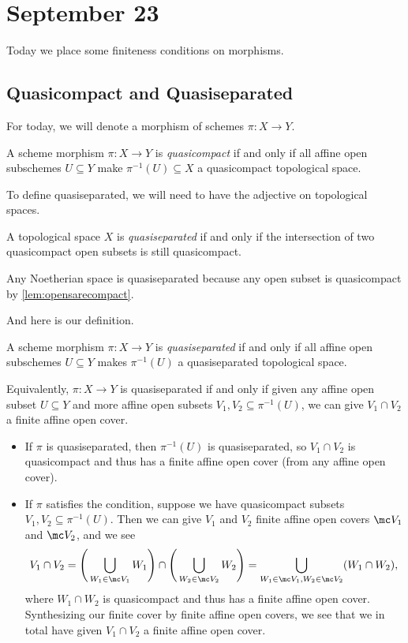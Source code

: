\documentclass[../notes.tex]{subfiles}
\begin{document}
\section{September 23}

Today we place some finiteness conditions on morphisms.

\subsection{Quasicompact and Quasiseparated}
For today, we will denote a morphism of schemes $\pi\colon X\to Y$.
\begin{definition}[Quasicompact]
	A scheme morphism $\pi\colon X\to Y$ is \textit{quasicompact} if and only if all affine open subschemes $U\subseteq Y$ make $\pi^{-1}(U)\subseteq X$ a quasicompact topological space.
\end{definition}
To define quasiseparated, we will need to have the adjective on topological spaces.
\begin{definition}[Quasiseperated]
	A topological space $X$ is \textit{quasiseparated} if and only if the intersection of two quasicompact open subsets is still quasicompact.
\end{definition}
\begin{example}
	Any Noetherian space is quasiseparated because any open subset is quasicompact by \autoref{lem:opensarecompact}.
\end{example}
And here is our definition.
\begin{defi}[Quasiseparated]
	A scheme morphism $\pi\colon X\to Y$ is \textit{quasiseparated} if and only if all affine open subschemes $U\subseteq Y$ makes $\pi^{-1}(U)$ a quasiseparated topological space.
\end{defi}
\begin{remark}
	Equivalently, $\pi\colon X\to Y$ is quasiseparated if and only if given any affine open subset $U\subseteq Y$ and more affine open subsets $V_1,V_2\subseteq\pi^{-1}(U)$, we can give $V_1\cap V_2$ a finite affine open cover.
	\begin{itemize}
		\item If $\pi$ is quasiseparated, then $\pi^{-1}(U)$ is quasiseparated, so $V_1\cap V_2$ is quasicompact and thus has a finite affine open cover (from any affine open cover).
		\item If $\pi$ satisfies the condition, suppose we have quasicompact subsets $V_1,V_2\subseteq\pi^{-1}(U)$. Then we can give $V_1$ and $V_2$ finite affine open covers $\mc V_1$ and $\mc V_2$, and we see
		\[V_1\cap V_2=\Bigg(\bigcup_{W_1\in\mc V_1}W_1\Bigg)\cap\Bigg(\bigcup_{W_2\in\mc V_2}W_2\Bigg)=\bigcup_{W_1\in\mc V_1,W_2\in\mc V_2}(W_1\cap W_2),\]
		where $W_1\cap W_2$ is quasicompact and thus has a finite affine open cover. Synthesizing our finite cover by finite affine open covers, we see that we in total have given $V_1\cap V_2$ a finite affine open cover.
	\end{itemize}
\end{remark}
\end{document}
